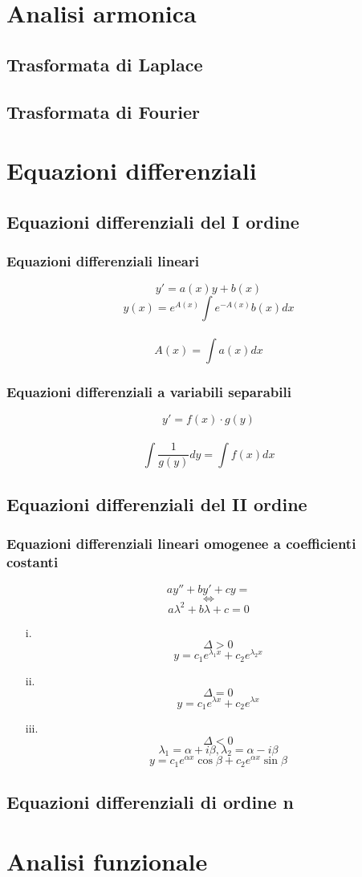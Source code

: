 \documentclass[a4paper,12pt]{report}
\theoremstyle{mystyle}
\begin{document}
\newpage

\part{Analisi armonica}
\chapter{Trasformata di Laplace}

\chapter{Trasformata di Fourier}

\newpage

\part{Equazioni differenziali}
\chapter{Equazioni differenziali del I ordine}
\section{Equazioni differenziali lineari}
\[y' = a(x)y + b(x) \]
\[y(x)=e^{A(x)} \int e ^{-A(x)} b(x) dx \]\\
\[A(x)=\int a(x) dx \]


\section{Equazioni differenziali a variabili separabili}
\[y'=f(x) \cdot g(y) \]\\
\[\int \frac{1}{g(y)} dy = \int f(x) dx \]

\chapter{Equazioni differenziali del II ordine}
\section{Equazioni differenziali lineari omogenee a coefficienti costanti}
\[ay''+by'+cy=\]
\[\Leftrightarrow\]
\[a\lambda^2+b \lambda + c = 0\]
\begin{enumerate}
    \item[i.] \[\Delta >0\]
        \[y=c_1e^{\lambda_1 x}+c_2 e^{\lambda_2x}\]
    \item[ii.] \[\Delta = 0\]
        \[y=c_1e^{\lambda x}+c_2e^{\lambda x}\]
    \item[iii.] \[\Delta <0\]
        \[\lambda_1 = \alpha + i \beta, \lambda_2 = \alpha - i \beta\]
        \[y=c_1 e^{\alpha x}\cos \beta + c_2 e^{\alpha x}\sin \beta\]
\end{enumerate}

\chapter{Equazioni differenziali di ordine n}

\newpage

\part{Analisi funzionale}


\appendix
\end{document}
